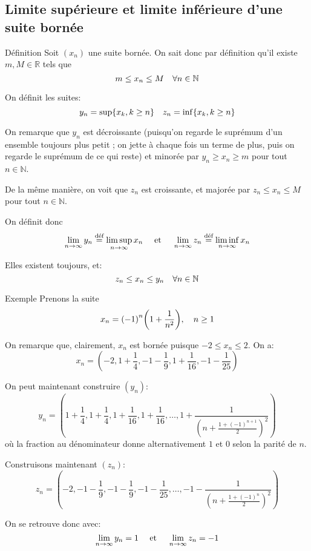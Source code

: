 \documentclass[a4paper]{article}
\begin{document}
\subsection[Limpsup et liminf]{Limite supérieure et limite inférieure d'une suite bornée}
\begin{parag}{Définition}
    Soit $\left(x_n\right)$ une suite bornée. On sait donc par définition qu'il existe $m, M \in \mathbb{R}$ tels que 
    \[m \leq x_n \leq M \mathspace \forall n \in \mathbb{N}\]
    
    On définit les suites:
    \[y_n = \sup\left\{x_k, k \geq n\right\} \mathspace z_n = \inf\left\{x_k, k \geq n\right\}\]
    
    On remarque que $y_n$ est décroissante (puisqu'on regarde le suprémum d'un ensemble toujours plus petit ; on jette à chaque fois un terme de plus, puis on regarde le suprémum de ce qui reste) et minorée par $y_n \geq x_n \geq m$ pour tout $n \in \mathbb{N}$. 

    De la même manière, on voit que $z_n$ est croissante, et majorée par $z_n \leq x_n \leq M$ pour tout $n \in \mathbb{N}$.

    On définit donc 
    \[\lim_{n \to \infty} y_n \over{=}{déf} \limsup_{n \to \infty} x_n \mathspace \text{ et } \mathspace \lim_{n \to \infty} z_n \over{=}{déf} \liminf_{n \to \infty} x_n\]
    
    Elles existent toujours, et:
    \[z_n \leq x_n \leq y_n \mathspace \forall n \in \mathbb{N}\]
\end{parag}

\begin{parag}{Exemple}
    Prenons la suite 
    \[x_n = \left(-1\right)^{n} \left(1 + \frac{1}{n^2}\right), \mathspace n \geq 1\]
    
    On remarque que, clairement, $x_n$ est bornée puisque $-2 \leq x_n \leq 2$. On a: 
    \[x_n = \left(-2, 1 + \frac{1}{4}, -1 - \frac{1}{9}, 1 + \frac{1}{16}, -1 - \frac{1}{25}\right)\]

    On peut maintenant construire $\left(y_n\right)$: 
    \[y_n = \left(1 + \frac{1}{4}, 1 + \frac{1}{4}, 1 + \frac{1}{16}, 1 + \frac{1}{16}, \ldots, 1 + \frac{1}{\left(n + \frac{1 + \left(-1\right)^{n+1}}{2}\right)^2}\right)\]
    où la fraction au dénominateur donne alternativement $1$ et $0$ selon la parité de $n$. 

    Construisons maintenant $\left(z_n\right)$: 
    \[z_n = \left(-2, -1 - \frac{1}{9}, -1 - \frac{1}{9}, -1 - \frac{1}{25}, \ldots, -1 - \frac{1}{\left(n + \frac{1 + \left(-1\right)^{n}}{2}\right)^2}\right)\]
    
    On se retrouve donc avec: 
    \[\lim_{n \to \infty} y_n = 1 \mathspace \text{ et } \mathspace \lim_{n \to \infty} z_n = -1\]
\end{parag}
\end{document}
